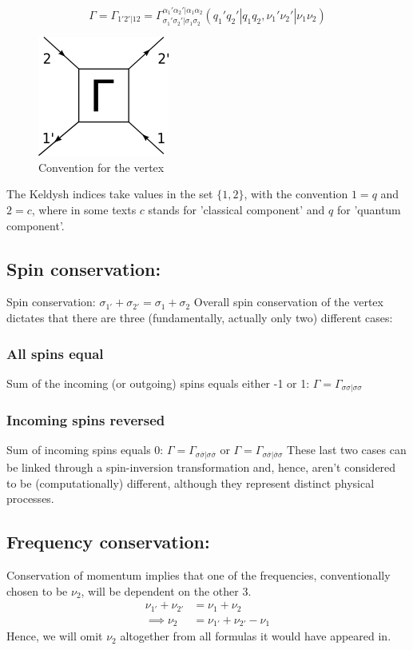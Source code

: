 \documentclass[12pt,a4paper,roman]{article}
\begin{document}
\begin{equation}
    \Gamma = \Gamma_{1'2'|12} = \Gamma_{\sigma_1'\sigma_2'|\sigma_1\sigma_2}^{\alpha_1'\alpha_2'|\alpha_1\alpha_2}(q_1'q_2'|q_1q_2, \nu_1'\nu_2'|\nu_1\nu_2)
\end{equation}
\begin{figure}[H]
\centering
\includegraphics[scale=0.65]{vertex.png}
\caption{Convention for the vertex}
\label{fig:vertex}
\end{figure}
The Keldysh indices take values in the set $\{1,2\}$, with the convention $1 = q$ and $2=c$, where in some texts $c$ stands for 'classical component' and $q$ for 'quantum component'.
\subsection*{Spin conservation:}
Spin conservation: $\sigma_{1'} + \sigma_{2'} = \sigma_1 + \sigma_2$
Overall spin conservation of the vertex dictates that there are three (fundamentally, actually only two) different cases:
\subsubsection*{All spins equal}
Sum of the incoming (or outgoing) spins equals either -1 or 1: 
$\Gamma = \Gamma_{\sigma\sigma|\sigma\sigma}$
\subsubsection*{Incoming spins reversed}
Sum of incoming spins equals 0: 
$\Gamma = \Gamma_{\sigma\overline{\sigma}|\sigma\overline{\sigma}}$ or $\Gamma = \Gamma_{\sigma\overline{\sigma}|\overline{\sigma}\sigma}$
These last two cases can be linked through a spin-inversion transformation and, hence, aren't considered to be (computationally) different, although they represent distinct physical processes.

\subsection*{Frequency conservation:}
Conservation of momentum implies that one of the frequencies, conventionally chosen to be $\nu_2$, will be dependent on the other 3.
\begin{align}
    \nu_{1'} + \nu_{2'} &= \nu_1 + \nu_2  \\
    \implies \nu_2 &= \nu_{1'} + \nu_{2'} -\nu_1
\end{align}
Hence, we will omit $\nu_{2}$ altogether from all formulas it would have appeared in.
\end{document}

